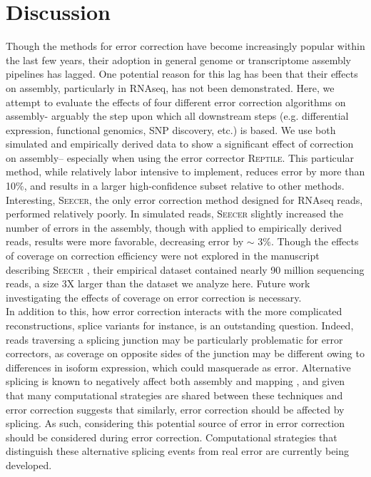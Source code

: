 \documentclass[11pt]{article}
\begin{document}
\section*{Discussion}

Though the methods for error correction have become increasingly popular within the last few years, their adoption in general genome or transcriptome assembly pipelines has lagged. One potential reason for this lag has been that their effects on assembly, particularly in RNAseq, has not been demonstrated. Here, we attempt to evaluate the effects of four different error correction algorithms on assembly- arguably the step upon which all downstream steps (e.g. differential expression, functional genomics, SNP discovery, etc.) is based. We use both simulated and empirically derived data to show a significant effect of correction on assembly-- especially when using the error corrector \textsc{Reptile}. This particular method, while relatively labor intensive to implement, reduces error by more than 10\%, and results in a larger high-confidence subset relative to other methods.  \\


\noindent
Interesting, \textsc{Seecer}, the only error correction method designed for RNAseq reads, performed relatively poorly. In simulated reads, \textsc{Seecer} slightly increased the number of errors in the assembly, though with applied to empirically derived reads, results were more favorable, decreasing error by $\sim$ 3\%.  Though the effects of coverage on correction efficiency were not explored in the manuscript describing \textsc{Seecer} \citep{Le:2013dy}, their empirical dataset contained nearly 90 million sequencing reads, a size 3X larger than the dataset we analyze here.  Future work investigating the effects of coverage on error correction is necessary.  \\

\noindent
In addition to this, how error correction interacts with the more complicated reconstructions, splice variants for instance, is an outstanding question. Indeed, reads traversing a splicing junction may be particularly problematic for error correctors, as coverage on opposite sides of the junction may be different owing to differences in isoform expression, which could masquerade as error.  Alternative splicing is known to negatively affect both assembly and mapping \citep{Vijay:2012gy,Sammeth:2009jx,Pyrkosz:2013tm}, and given that many computational strategies are shared between these techniques and error correction suggests that similarly, error correction should be affected by splicing.  As such, considering this potential source of error in error correction should be considered during error correction. Computational strategies that distinguish these alternative splicing events from real error are currently being developed.   
 
\end{document}
